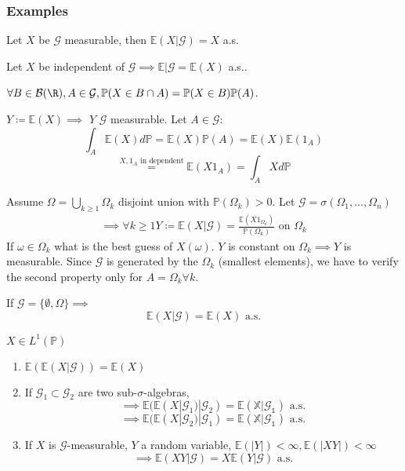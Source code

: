\subsubsection{Examples}

\begin{example}
    Let $X$ be $\mathcal{G}$ measurable, then $\mathbb{E}(X|\mathcal{G})=X$ a.s.
\end{example}

\begin{example}
    Let $X$ be independent of $\mathcal{G}\implies \mathbb{E|\mathcal{G}}=\mathbb{E}(X)$ a.s..
\end{example}

\begin{remark}
    $\forall B\in \mathcal{B}(\R), A\in\mathcal{G}, \mathbb{P}(X\in B\cap A)=\mathbb{P}(X\in B)\mathbb{P}(A)$.
    
    $Y\coloneqq \mathbb{E}(X)\implies$ $Y$ $\mathcal{G}$ measurable. Let $A\in\mathcal{G}$:
    \[\int_A \mathbb{E}(X)d\mathbb{P}=\mathbb{E}(X)\mathbb{P}(A)=\mathbb{E}(X)\mathbb{E}(1_A)\]
    \[\stackrel{X,1_A \text{ in dependent}}{=}\mathbb{E}(X1_A)=\int_A X d\mathbb{P}\]  
\end{remark}

\begin{example}
    Assume $\Omega=\bigcup_{k\geq 1}\Omega_k$ disjoint union with $\mathbb{P}(\Omega_k)>0$.
    Let $\mathcal{G}=\sigma(\Omega_1,\dots,\Omega_n)$
    \begin{align*}
       \implies \forall k \geq 1 Y\coloneqq \mathbb{E}(X|\mathcal{G})=\frac{\mathbb{E}(X1_{\Omega_k})}{\mathbb{P}(\Omega_k)}\text{ on }\Omega_k
    \end{align*}
    If $\omega\in\Omega_k$ what is the best guess of $X(\omega)$. $Y$ is constant on $\Omega_k\implies Y$ is measurable.
    Since $\mathcal{G}$ is generated by the $\Omega_k$ (smallest elements), we have to verify the second property only for $A=\Omega_k\forall k$.
\end{example}

\begin{remark}
    If $\mathcal{G}=\{\emptyset,\Omega\}\implies$ \[\mathbb{E}(X|\mathcal{G})=\mathbb{E}(X) \text{ a.s.}\]
\end{remark}

\begin{proposition}
$X\in L^1(\mathbb{P})$
\begin{enumerate}
    \item $\mathbb{E}( \mathbb{E}(X|\mathcal{G}))=\mathbb{E}(X)$
    \item If $\mathcal{G}_1\subset \mathcal{G}_2$ are two sub-$\sigma$-algebras,
    \[\implies \mathbb{E}(\mathbb{E}(X|\mathcal{G}_1)|\mathcal{G}_2)=\mathbb{E(X|\mathcal{G}_1)}\text{ a.s.}\]
    \[\implies \mathbb{E}(\mathbb{E}(X|\mathcal{G}_2)|\mathcal{G}_1)=\mathbb{E(X|\mathcal{G}_1)}\text{ a.s.}\]
    \item If $X$ is $\mathcal{G}$-measurable, $Y$ a random variable, $\mathbb{E}(|Y|)<\infty,\mathbb{E}(|XY|)<\infty$\[\implies \mathbb{E}(XY|\mathcal{G})=X\mathbb{E}(Y|\mathcal{G})\text{ a.s.}\] 
\end{enumerate}    
\end{proposition}



